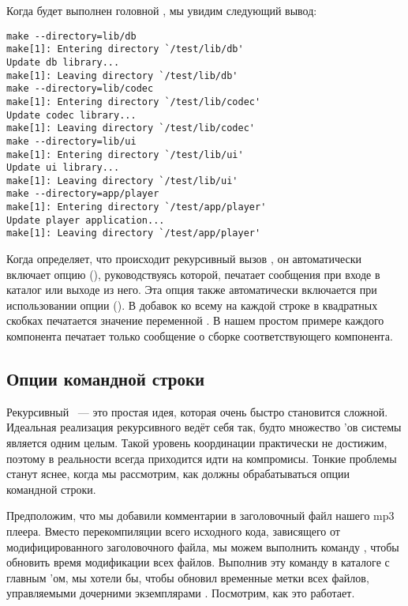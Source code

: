 Когда будет выполнен головной \Makefile{}, мы увидим следующий вывод:

{\footnotesize
\begin{verbatim}
make --directory=lib/db
make[1]: Entering directory `/test/lib/db'
Update db library...
make[1]: Leaving directory `/test/lib/db'
make --directory=lib/codec
make[1]: Entering directory `/test/lib/codec'
Update codec library...
make[1]: Leaving directory `/test/lib/codec'
make --directory=lib/ui
make[1]: Entering directory `/test/lib/ui'
Update ui library...
make[1]: Leaving directory `/test/lib/ui'
make --directory=app/player
make[1]: Entering directory `/test/app/player'
Update player application...
make[1]: Leaving directory `/test/app/player'
\end{verbatim}
}

Когда \GNUmake{} определяет, что происходит рекурсивный вызов
\GNUmake{}, он автоматически включает опцию
 (), руководствуясь
которой, \GNUmake{} печатает сообщения при входе в каталог или выходе
из него. Эта опция также автоматически включается при использовании
опции  (). В добавок ко всему на
каждой строке в квадратных скобках печатается значение переменной
. В нашем простом примере \Makefile{} каждого
компонента печатает только сообщение о сборке соответствующего
компонента.

\subsection{Опции командной строки}
\label{sec:command_line_options}

Рекурсивный \GNUmake{}~--- это простая идея, которая очень быстро
становится сложной. Идеальная реализация рекурсивного \GNUmake{} ведёт
себя так, будто множество \Makefile{}'ов системы является одним целым.
Такой уровень координации практически не достижим, поэтому в
реальности всегда приходится идти на компромисы. Тонкие проблемы
станут яснее, когда мы рассмотрим, как должны обрабатываться опции
командной строки.

Предположим, что мы добавили комментарии в заголовочный файл нашего
mp3 плеера. Вместо перекомпиляции всего исходного кода, зависящего от
модифицированного заголовочного файла, мы можем выполнить команду
, чтобы обновить время модификации всех
файлов. Выполнив эту команду в каталоге с главным \Makefile{}'ом, мы
хотели бы, чтобы \GNUmake{} обновил временные метки всех файлов,
управляемыми дочерними экземплярами \GNUmake{}. Посмотрим, как это
работает.

